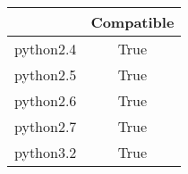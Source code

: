 \begin{table}[ht]
	\begin{center}
	\label{tab:compatibleTable}
		\begin{tabular}{rc}
		\toprule
			 & Compatible\\
			\midrule
			python2.4 & True\\
			python2.5 & True\\
			python2.6 & True\\
			python2.7 & True\\
			python3.2 & True\\
		\bottomrule
		\end{tabular}
	\end{center}
\end{table}